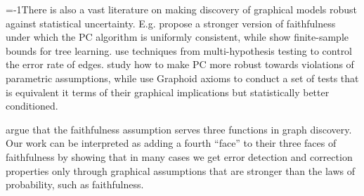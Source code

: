 \looseness=-1There is also a vast literature on making discovery of graphical models robust against statistical uncertainty.
E.g. \citet{kalisch2007estimating} propose a stronger version of faithfulness under which the PC algorithm is uniformly consistent, while \citet{bhattacharyya2021near} show finite-sample bounds for tree learning.
\citet{strobl2016estimating,li2009controlling} use techniques from multi-hypothesis testing to control the error rate of edges. %
\citet{kalisch2008robustification, harris2013pc} study how to make PC more robust towards violations of parametric assumptions, while \citet{kim2024causal} use Graphoid axioms to conduct a set of tests that is equivalent it terms of their graphical implications but statistically better conditioned.

\citet{zhang2016three} argue that the faithfulness assumption serves three functions in graph discovery.
Our work can be interpreted as adding a fourth \enquote{face} to their three faces of faithfulness by showing that in many cases we get error detection and correction properties only through graphical assumptions that are stronger than the laws of probability, such as faithfulness.

